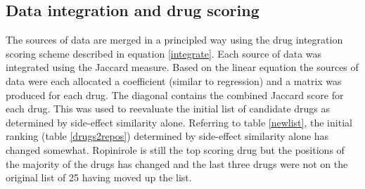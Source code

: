\documentclass[preprint,11pt]{elsarticle}
\begin{document}
\subsection{Data integration and drug scoring}
The sources of data are merged in a principled way using the drug integration scoring scheme described in equation \ref{integrate}.  Each source of data was integrated using the Jaccard measure. Based on  the linear equation the sources of data were each allocated a coefficient (similar to regression) and a matrix was produced for each drug. The diagonal contains the combined Jaccard score for each drug. This was used to reevaluate the initial list of candidate drugs as determined by side-effect similarity alone. Referring to table \ref{newlist}, the initial ranking (table \ref{drugs2repos}) determined by side-effect similarity alone has changed somewhat. Ropinirole is still the top scoring drug but the positions of the majority of the drugs has changed and the last three drugs were not on the original list of 25 having moved up the list.
\end{document}
